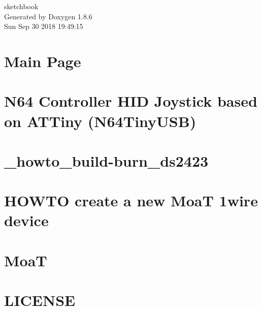 \documentclass[twoside]{book}
\newcommand{\clearemptydoublepage}{%
  \newpage{\pagestyle{empty}\cleardoublepage}%
}
\begin{document}
\hypersetup{pageanchor=false}
\begin{titlepage}
\vspace*{7cm}
\begin{center}%
{\Large sketchbook }\\
\vspace*{1cm}
{\large Generated by Doxygen 1.8.6}\\
\vspace*{0.5cm}
{\small Sun Sep 30 2018 19:49:15}\\
\end{center}
\end{titlepage}
\clearemptydoublepage
\tableofcontents
\clearemptydoublepage
{}
\hypersetup{pageanchor=true}

\chapter{Main Page}
\label{index}\hypertarget{index}{}
\chapter{N64 Controller H\-I\-D Joystick based on A\-T\-Tiny (N64\-Tiny\-U\-S\-B)}
\label{md_cli_n64dual_tiny45_README}
\hypertarget{md_cli_n64dual_tiny45_README}{}

\chapter{\-\_\-howto\-\_\-build-\/burn\-\_\-ds2423}
\label{md_cli_owslave__howto_build-burn_ds2423}
\hypertarget{md_cli_owslave__howto_build-burn_ds2423}{}

\chapter{H\-O\-W\-T\-O create a new Moa\-T 1wire device}
\label{md_cli_owslave_HOWTO}
\hypertarget{md_cli_owslave_HOWTO}{}

\chapter{Moa\-T}
\label{md_cli_owslave_README}
\hypertarget{md_cli_owslave_README}{}

\chapter{L\-I\-C\-E\-N\-S\-E}
\label{md_LICENSE}
\hypertarget{md_LICENSE}{}

\end{document}
